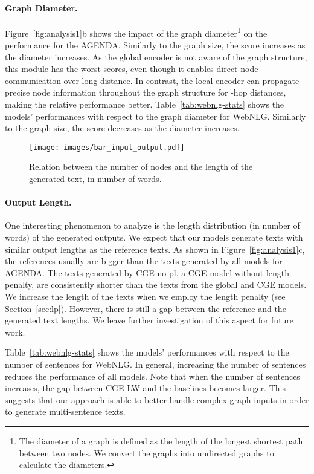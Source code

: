 \documentclass[11pt,a4paper]{article}
\begin{document}
\paragraph{Graph Diameter.} Figure~\ref{fig:analysis1}b shows the impact of the graph diameter\footnote{The diameter of a graph is defined as the length of the longest shortest path between two nodes. We convert the graphs into undirected graphs to calculate the diameters.} on the performance for the AGENDA. Similarly to the graph size, the score increases as the diameter increases. As the global encoder is not aware of the graph structure, this module has the worst scores, even though it enables direct node communication over long distance. In contrast, the local encoder can propagate precise node information throughout the graph structure for -hop distances, making the relative performance better. Table~\ref{tab:webnlg-stats} shows the models' performances with respect to the graph diameter for WebNLG. Similarly to the graph size, the score decreases as the diameter increases.


 \begin{figure}[t]
    \centering
    \texttt{[image: images/bar\_input\_output.pdf]}
    \vspace{-3mm}
    \caption{Relation between the number of nodes and the length of the generated text, in number of words.}
    \label{fig:comparison-input-output}
\end{figure}

\paragraph{Output Length.} One interesting phenomenon to analyze is the length distribution (in number of words) of the generated outputs. We expect that our models generate texts with similar output lengths as the reference texts. As shown in Figure~\ref{fig:analysis1}c, the references usually are bigger than the texts generated by all models for AGENDA. The texts generated by {\selectfont CGE-no-pl}, a {\selectfont CGE} model without length penalty, are consistently shorter than the texts from the global and {\selectfont CGE} models. We increase the length of the texts when we employ the length penalty (see Section~\ref{sec:lp}). However, there is still a gap between the reference and the generated text lengths. We leave further investigation of this aspect for future work. 


Table~\ref{tab:webnlg-stats} shows the models' performances with respect to the number of sentences for WebNLG. In general, increasing the number of sentences reduces the performance of all models. Note that when the number of sentences increases, the gap between {\selectfont CGE-LW} and the baselines becomes larger. This suggests that our approach is able to better handle complex graph inputs in order to generate multi-sentence texts.
\end{document}
